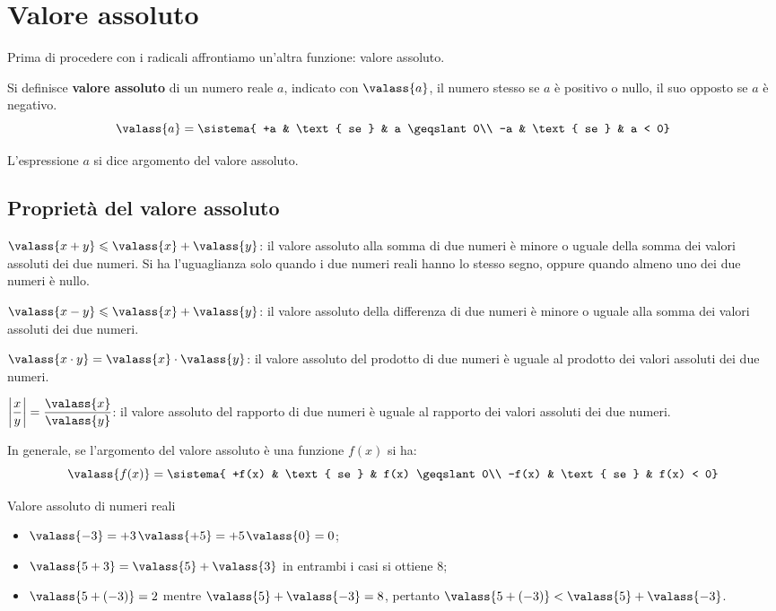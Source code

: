 \section{Valore assoluto}
\label{sec:radicali_valass}

Prima di procedere con i radicali affrontiamo un'altra funzione: valore 
assoluto.

\begin{definizione}{}{}
Si definisce \textbf{valore assoluto} di un numero reale \(a\), indicato con
\(\valass{a}\), il numero stesso se \(a\) è positivo o nullo, il suo opposto 
se \(a\) è negativo.
\[\valass{a} = \sistema{
+a & \text{ se } & a \geqslant 0\\
-a & \text{ se } & a < 0}\]
\end{definizione}

L'espressione \(a\) si dice argomento del valore assoluto.


\subsection{Proprietà del valore assoluto}
\(\valass{x+y}\leqslant \valass{x}+\valass{y}\): il valore assoluto alla 
somma di due numeri è minore o uguale della somma dei valori assoluti dei 
due numeri. 
Si ha l'uguaglianza solo quando i due numeri reali hanno lo stesso segno, 
oppure quando almeno uno dei due numeri è nullo.

\(\valass{x-y}\leqslant \valass{x}+\valass{y}\): il valore assoluto della 
differenza di due numeri è minore o uguale alla somma dei valori assoluti 
dei due numeri.

\(\valass{x\cdot y}=\valass{x}\cdot \valass{y}\): il valore assoluto del 
prodotto di due numeri è uguale al prodotto dei valori assoluti dei due 
numeri.

\(\left |{\dfrac{x}{y}}\right|=\dfrac{\valass{x}}{\valass{y}}\): il valore 
assoluto del rapporto di due numeri è uguale al rapporto dei valori 
assoluti dei due numeri.

In generale, se l'argomento del valore assoluto è una funzione \(f(x)\) 
si ha:
\[\valass{f(x)} = \sistema{
+f(x) & \text{ se } & f(x) \geqslant 0\\
-f(x) & \text{ se } & f(x) < 0}\]

\begin{esempio}{}{}
Valore assoluto di numeri reali
\begin{itemize} [noitemsep]
\item \(\valass{-3}=+3\)\quad \(\valass{+5}=+5\)\quad \(\valass{0}=0\);
\item \(\valass{5+3}=\valass{5}+\valass{3}\) in entrambi i casi si ottiene 
\(8\);
\item \(\valass{5+(-3)}=2\) mentre \(\valass{5}+\valass{-3}=8\), pertanto 
\(\valass{5+(-3)}<\valass{5}+\valass{-3}\).
\end{itemize}
\end{esempio}


